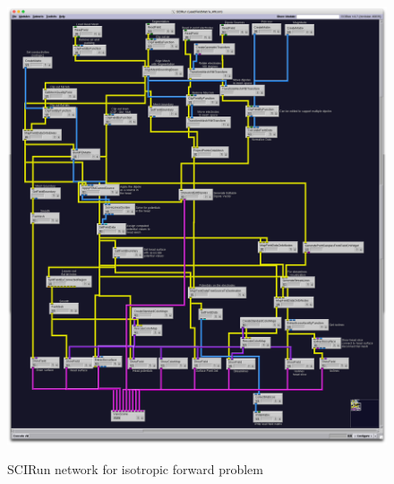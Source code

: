 \begin{figure}[p]
\begin{center}
\includegraphics[width=\textwidth]{Figures/iso_network.png}\\
\caption{SCIRun network for isotropic forward problem}
\label{fig:isofornet}
\end{center}
\end{figure}

